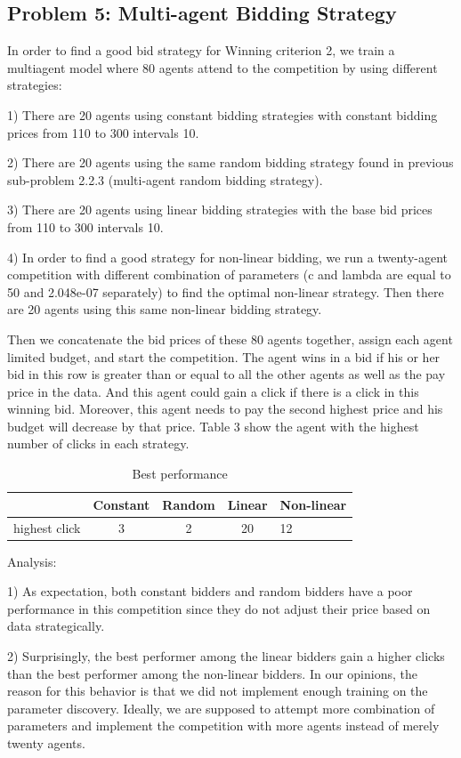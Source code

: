 \documentclass{sig-alternate-05-2015}
\begin{document}
\subsection{Problem 5: Multi-agent Bidding Strategy}

In order to find a good bid strategy for Winning criterion 2, we train a multiagent model where 80 agents attend to the competition by using different strategies:

1)	There are 20 agents using constant bidding strategies with constant bidding prices from 110 to 300 intervals 10.

2)	There are 20 agents using the same random bidding strategy found in previous sub-problem 2.2.3 (multi-agent random bidding strategy).

3)	There are 20 agents using linear bidding strategies with the base bid prices from 110 to 300 intervals 10.

4)	In order to find a good strategy for non-linear bidding, we run a twenty-agent competition with different combination of parameters (c and lambda are equal to 50 and 2.048e-07 separately) to find the optimal non-linear strategy. Then there are 20 agents using this same non-linear bidding strategy.

Then we concatenate the bid prices of these 80 agents together, assign each agent limited budget, and start the competition. The agent wins in a bid if his or her bid in this row is greater than or equal to all the other agents as well as the pay price in the data. And this agent could gain a click if there is a click in this winning bid. Moreover, this agent needs to pay the second highest price and his budget will decrease by that price. Table 3 show the agent with the highest number of clicks in each strategy.

\begin{table}
\centering
\caption{Best performance}
\begin{tabular}{|c|c|c|c|l|} \hline
&Constant &Random &Linear&Non-linear\\ \hline
highest click&3&2&20&12\\
\hline\end{tabular}
\end{table}

Analysis:

1)	As expectation, both constant bidders and random bidders have a poor performance in this competition since they do not adjust their price based on data strategically.

2)	Surprisingly, the best performer among the linear bidders gain a higher clicks than the best performer among the non-linear bidders. In our opinions, the reason for this behavior is that we did not implement enough training on the parameter discovery. Ideally, we are supposed to attempt more combination of parameters and implement the competition with more agents instead of merely twenty agents.
\end{document}
